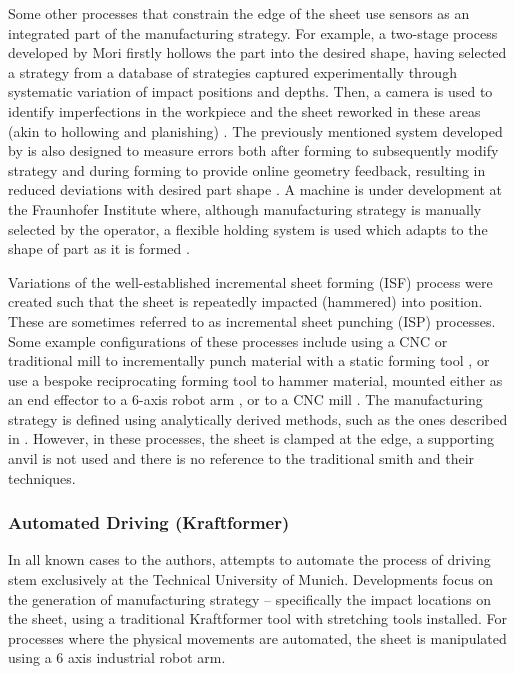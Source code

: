 Some other processes that constrain the edge of the sheet use sensors as an integrated part of the manufacturing strategy. For example, a two-stage process developed by Mori firstly hollows the part into the desired shape, having selected a strategy from a database of strategies captured experimentally through systematic variation of impact positions and depths. Then, a camera is used to identify imperfections in the workpiece and the sheet reworked in these areas (akin to hollowing and planishing) \citep{Mori1998IncrementalDatabase}. The previously mentioned system developed by \cite{Tanaka2008FormingMeasurement} is also designed to measure errors both after forming to subsequently modify strategy and during forming to provide online geometry feedback, resulting  in reduced deviations with desired part shape \citep{Tanaka2014DevelopmentHammering}. A machine is under development at the Fraunhofer Institute where, although manufacturing strategy is manually selected by the operator, a flexible holding system is used which adapts to the shape of part as it is formed \citep{Sharon2014FraunhoferReport}.

Variations of the well-established incremental sheet forming (ISF) process were created such that the sheet is repeatedly impacted (hammered) into position. These are sometimes referred to as incremental sheet punching (ISP) processes. Some example configurations of these processes include using a CNC or traditional mill to incrementally punch material with a static forming tool \citep{Wang2017IncrementalPath,Zhu2019ToolForming}, or use a bespoke reciprocating forming tool to hammer material, mounted either as an end effector to a 6-axis robot arm \citep{Schafer2005IncrementalRobots, Puzik2008IncrementalApplication, Luo2010AResults}, or to a CNC mill \citep{Asgari2017DesignDamper}. The manufacturing strategy is defined using analytically derived methods, such as the ones described in \cite{Schafer2005IncrementalRobots,Wang2017IncrementalPath,Zhu2019ToolForming,Luo2010ASimulation}. However, in these processes, the sheet is clamped at the edge, a supporting anvil is not used and there is no reference to the traditional smith and their techniques.
 

\subsubsection{Automated Driving (Kraftformer)} \label{sec:MechKraftformer}
In all known cases to the authors, attempts to automate the process of driving stem exclusively at the Technical University of Munich. Developments focus on the generation of manufacturing strategy – specifically the impact locations on the sheet, using a traditional Kraftformer tool with stretching tools installed. For processes where the physical movements are automated, the sheet is manipulated using a 6 axis industrial robot arm.

